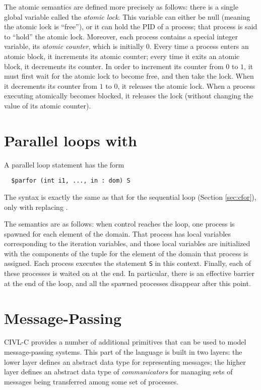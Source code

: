 The atomic semantics are defined more precisely as follows: there is a
single global variable called the \emph{atomic lock}. This variable
can either be null (meaning the atomic lock is ``free''), or it can
hold the PID of a process; that process is said to ``hold'' the atomic
lock.  Moreover, each process contains a special integer variable, its
\emph{atomic counter}, which is initially 0.  Every time a process
enters an atomic block, it increments its atomic counter; every time
it exits an atomic block, it decrements its counter.  In order to
increment its counter from $0$ to $1$, it must first wait for the
atomic lock to become free, and then take the lock.  When it
decrements its counter from $1$ to $0$, it releases the atomic lock.
When a process executing atomically becomes blocked, it releases the
lock (without changing the value of its atomic counter).

\section{Parallel loops with \cparfor}
\label{sec:parfor}

A parallel loop statement has the form
\begin{verbatim}
  $parfor (int i1, ..., in : dom) S
\end{verbatim}
The syntax is exactly the same as that for the sequential loop \cfor
(Section \ref{sec:cfor}), only with \cparfor{} replacing \cfor.

The semantics are as follows: when control reaches the loop, one
process is spawned for each element of the domain.  That process has
local variables corresponding to the iteration variables, and those
local variables are initialized with the components of the tuple for
the element of the domain that process is assigned.  Each process
executes the statement \texttt{S} in this context.  Finally, each of
these processes is waited on at the end.  In particular, there is an
effective barrier at the end of the loop, and all the spawned
processes disappear after this point.

\section{Message-Passing}

CIVL-C provides a number of additional primitives that can be used to
model message-passing systems.  This part of the language is built in
two layers: the lower layer defines an abstract data type for
representing messages; the higher layer defines an abstract data type
of \emph{communicators} for managing sets of messages being
transferred among some set of processes.

